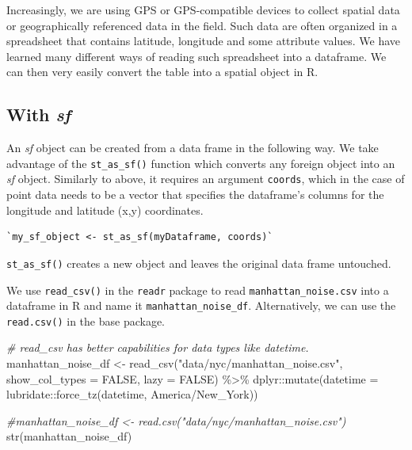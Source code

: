 \documentclass[
  11pt,
]{book}
\newenvironment{Shaded}{\begin{snugshade}}{\end{snugshade}}
\newcommand{\AttributeTok}[1]{\textcolor[rgb]{0.77,0.63,0.00}{#1}}
\newcommand{\CommentTok}[1]{\textcolor[rgb]{0.56,0.35,0.01}{\textit{#1}}}
\newcommand{\ConstantTok}[1]{\textcolor[rgb]{0.00,0.00,0.00}{#1}}
\newcommand{\FunctionTok}[1]{\textcolor[rgb]{0.00,0.00,0.00}{#1}}
\newcommand{\NormalTok}[1]{#1}
\newcommand{\OtherTok}[1]{\textcolor[rgb]{0.56,0.35,0.01}{#1}}
\newcommand{\SpecialCharTok}[1]{\textcolor[rgb]{0.00,0.00,0.00}{#1}}
\newcommand{\StringTok}[1]{\textcolor[rgb]{0.31,0.60,0.02}{#1}}
\begin{document}
Increasingly, we are using GPS or GPS-compatible devices to collect spatial data or geographically referenced data in the field. Such data are often organized in a spreadsheet that contains latitude, longitude and some attribute values. We have learned many different ways of reading such spreadsheet into a dataframe. We can then very easily convert the table into a spatial object in R.

\hypertarget{with-sf}{%
\subsection{\texorpdfstring{With \emph{sf}}{With sf}}\label{with-sf}}

An \emph{sf} object can be created from a data frame in the following way. We take advantage of the \texttt{st\_as\_sf()} function which converts any foreign object into an \emph{sf} object. Similarly to above, it requires an argument \texttt{coords}, which in the case of point data needs to be a vector that specifies the dataframe's columns for the longitude and latitude (x,y) coordinates.

\begin{verbatim}
`my_sf_object <- st_as_sf(myDataframe, coords)`
\end{verbatim}

\texttt{st\_as\_sf()} creates a new object and leaves the original data frame untouched.

We use \texttt{read\_csv()} in the \texttt{readr} package to read \texttt{manhattan\_noise.csv} into a dataframe in R and name it \texttt{manhattan\_noise\_df}. Alternatively, we can use the \texttt{read.csv()} in the base package.

\begin{Shaded}
\begin{Highlighting}[]
\CommentTok{\# read\_csv has better capabilities for data types like datetime.}
\NormalTok{manhattan\_noise\_df }\OtherTok{\textless{}{-}} \FunctionTok{read\_csv}\NormalTok{(}\StringTok{"data/nyc/manhattan\_noise.csv"}\NormalTok{, }
                               \AttributeTok{show\_col\_types =} \ConstantTok{FALSE}\NormalTok{, }
                               \AttributeTok{lazy =} \ConstantTok{FALSE}\NormalTok{) }\SpecialCharTok{\%\textgreater{}\%}
\NormalTok{  dplyr}\SpecialCharTok{::}\FunctionTok{mutate}\NormalTok{(}\AttributeTok{datetime =}\NormalTok{ lubridate}\SpecialCharTok{::}\FunctionTok{force\_tz}\NormalTok{(datetime, }\StringTok{\textquotesingle{}America/New\_York\textquotesingle{}}\NormalTok{))}

\CommentTok{\#manhattan\_noise\_df \textless{}{-} read.csv("data/nyc/manhattan\_noise.csv")}
\FunctionTok{str}\NormalTok{(manhattan\_noise\_df)}
\end{Highlighting}
\end{Shaded}
\end{document}
